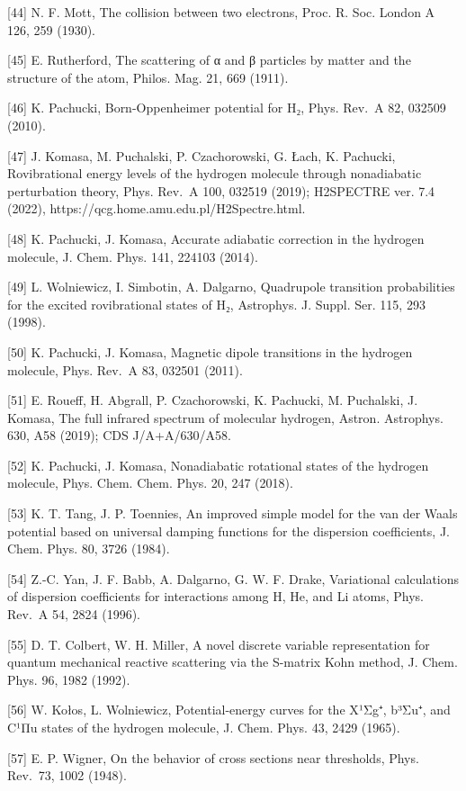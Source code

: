 \documentclass[
  a4paper,
]{article}
\begin{document}
{[}44{]} N. F. Mott, The collision between two electrons, Proc. R. Soc.
London A 126, 259 (1930).

{[}45{]} E. Rutherford, The scattering of α and β particles by matter
and the structure of the atom, Philos. Mag. 21, 669 (1911).

{[}46{]} K. Pachucki, Born-Oppenheimer potential for H₂, Phys. Rev.~A
82, 032509 (2010).

{[}47{]} J. Komasa, M. Puchalski, P. Czachorowski, G. Łach, K. Pachucki,
Rovibrational energy levels of the hydrogen molecule through
nonadiabatic perturbation theory, Phys. Rev.~A 100, 032519 (2019);
H2SPECTRE ver. 7.4 (2022), https://qcg.home.amu.edu.pl/H2Spectre.html.

{[}48{]} K. Pachucki, J. Komasa, Accurate adiabatic correction in the
hydrogen molecule, J. Chem. Phys. 141, 224103 (2014).

{[}49{]} L. Wolniewicz, I. Simbotin, A. Dalgarno, Quadrupole transition
probabilities for the excited rovibrational states of H₂, Astrophys. J.
Suppl. Ser. 115, 293 (1998).

{[}50{]} K. Pachucki, J. Komasa, Magnetic dipole transitions in the
hydrogen molecule, Phys. Rev.~A 83, 032501 (2011).

{[}51{]} E. Roueff, H. Abgrall, P. Czachorowski, K. Pachucki, M.
Puchalski, J. Komasa, The full infrared spectrum of molecular hydrogen,
Astron. Astrophys. 630, A58 (2019); CDS J/A+A/630/A58.

{[}52{]} K. Pachucki, J. Komasa, Nonadiabatic rotational states of the
hydrogen molecule, Phys. Chem. Chem. Phys. 20, 247 (2018).

{[}53{]} K. T. Tang, J. P. Toennies, An improved simple model for the
van der Waals potential based on universal damping functions for the
dispersion coefficients, J. Chem. Phys. 80, 3726 (1984).

{[}54{]} Z.-C. Yan, J. F. Babb, A. Dalgarno, G. W. F. Drake, Variational
calculations of dispersion coefficients for interactions among H, He,
and Li atoms, Phys. Rev.~A 54, 2824 (1996).

{[}55{]} D. T. Colbert, W. H. Miller, A novel discrete variable
representation for quantum mechanical reactive scattering via the
S-matrix Kohn method, J. Chem. Phys. 96, 1982 (1992).

{[}56{]} W. Kołos, L. Wolniewicz, Potential-energy curves for the X¹Σg⁺,
b³Σu⁺, and C¹Πu states of the hydrogen molecule, J. Chem. Phys. 43, 2429
(1965).

{[}57{]} E. P. Wigner, On the behavior of cross sections near
thresholds, Phys. Rev.~73, 1002 (1948).
\end{document}
